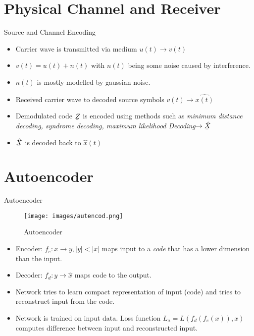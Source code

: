 \documentclass[xcolor=table,mathserif,9pt]{beamer}    %
\newcommand{\ubar}[1]{\underaccent{\bar}{#1}}
\begin{document}
\section{Physical Channel and Receiver}
\begin{frame}{Source and Channel Encoding}

\vspace{1em}
\begin{itemize}
	\item Carrier wave is transmitted via medium $u(t) \to v(t)$
	\item $v(t) = u(t) + n(t)$ with $n(t)$ being some noise caused by interference. 
	\item $n(t)$ is mostly modelled by gaussian noise.
\end{itemize}

\vspace{2em}

\vspace{1em}
\begin{itemize}
	\item Received carrier wave to decoded source symbols $v(t) \to \hat{x(t)}$
	\item Demodulated code $\ubar{Z}$ is encoded using methods such as \emph{minimum distance decoding, syndrome decoding, maximum
		likelihood Decoding}$\to \ubar{\hat{X}}$
	\item $\ubar{\hat{X}}$ is decoded back to $\hat{x}(t)$ 
\end{itemize}

\end{frame}

\section{Autoencoder}
\begin{frame}{Autoencoder}

	\begin{figure}[htpb]
		\centering
		\texttt{[image: images/autencod.png]}
		\caption{Autoencoder}
	\end{figure}

\begin{itemize}
	\item Encoder: $f_e: x \to y, |y| < |x|$ maps input to a \emph{code} that 
	      has a lower dimension than the input.
	\item Decoder: $f_d: y \to \hat{x}$ maps code to the output.
	\item Network tries to learn compact representation of input (code) and tries 
	      to reconstruct input from the code.
	\item Network is trained on input data. Loss function $L_a = L(f_d(f_e(x)),x)$              computes difference between input and reconstructed input.
\end{itemize}
\end{frame}
\end{document}
